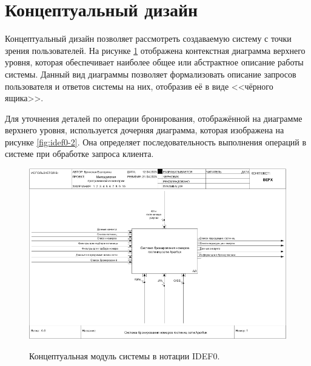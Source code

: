 \section*{Концептуальный дизайн}
Концептуальный дизайн позволяет рассмотреть создаваемую систему с точки зрения пользователей. На рисунке \ref{fig:idef0-1} отображена контекстная диаграмма верхнего уровня, которая обеспечивает наиболее общее или абстрактное описание работы системы. Данный вид диаграммы позволяет формализовать описание запросов пользователя и ответов системы на них, отобразив её в виде <<чёрного ящика>>.

Для уточнения деталей по операции бронирования, отображённой на диаграмме верхнего уровня, используется дочерняя диаграмма, которая изображена на рисунке \ref{fig:idef0-2}. Она определяет последовательность выполнения операций в системе при обработке запроса клиента. 

\begin{figure}[h!]
	\begin{center}
		{\includegraphics[scale = 0.82, angle=90]{img/idef0/01_A-0.png}}
		\caption{Концептуальная модуль системы в нотации IDEF0.}
		\label{fig:idef0-1}
	\end{center}
\end{figure}

